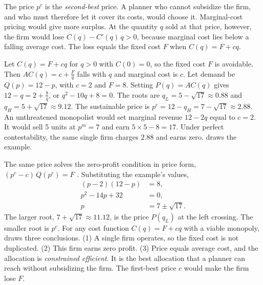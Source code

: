 The price $p^c$ is the \emph{second-best} price. A planner who cannot subsidize the firm, and who must
therefore let it cover its costs, would choose it. Marginal-cost pricing would give more surplus. At the
quantity $q$ sold at that price, however, the firm would lose $C(q)-C'(q)\,q>0$, because marginal cost lies
below a falling average cost. The loss equals the fixed cost $F$ when $C(q)=F+cq$.

\begin{example}\label{ex:09-contest}
Let $C(q) = F + cq$ for $q > 0$ with $C(0) = 0$, so the fixed cost $F$ is avoidable. Then
$AC(q) = c + \frac{F}{q}$ falls with $q$ and marginal cost is $c$. Let demand be $Q(p) = 12 - p$, with $c = 2$
and $F = 8$. Setting $P(q) = AC(q)$ gives $12 - q = 2 + \frac{8}{q}$, or $q^2 - 10q + 8 = 0$. The roots are
$q_L = 5 - \sqrt{17} \approx 0.88$ and $q_H = 5 + \sqrt{17} \approx 9.12$. The sustainable price is
$p^c = 12 - q_H = 7 - \sqrt{17} \approx 2.88$. An unthreatened monopolist would set marginal revenue
$12 - 2q$ equal to $c = 2$. It would sell 5 units at $p^m = 7$ and earn $5 \times 5 - 8 = 17$. Under perfect
contestability, the same single firm charges $2.88$ and earns zero.  draws the example.

The same price solves the zero-profit condition in price form, $(p^c - c)\,Q(p^c) = F$
\citep[sec.~8.1.2]{Tirole1988}. Substituting the example's values,
\begin{align*}
  (p - 2)(12 - p) &= 8, \\
  p^2 - 14p + 32 &= 0, \\
  p &= 7 \pm \sqrt{17}.
\end{align*}
The larger root, $7 + \sqrt{17} \approx 11.12$, is the price $P(q_L)$ at the left crossing. The smaller root is
$p^c$. For any cost function $C(q) = F + cq$ with a viable monopoly, \citeauthor{Tirole1988} draws three
conclusions. (1) A single firm operates, so the fixed cost is not duplicated. (2) This firm earns zero profit.
(3) Price equals average cost, and the allocation is \emph{constrained efficient}. It is the best allocation
that a planner can reach without subsidizing the firm. The first-best price $c$ would make the firm lose $F$.
\end{example}

